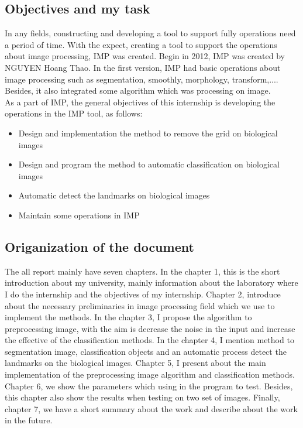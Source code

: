 \subsection{Objectives and my task}
In any fields, constructing and developing a tool to support fully operations need a period of time. With the expect, creating a tool to support the operations about image processing, IMP was created. Begin in 2012, IMP was created by NGUYEN Hoang Thao. In the first version, IMP had basic operations about image processing such as segmentation, smoothly, morphology, transform,.... Besides, it also integrated some algorithm which was processing on image.\\[0.2cm]
As a part of IMP, the general objectives of this internship is developing the operations in the IMP tool, as follows:
\begin{itemize}
\item Design and implementation the method to remove the grid on biological images
\item Design and program the method to automatic classification on biological images
\item Automatic detect the landmarks on biological images
\item Maintain some operations in IMP
\end{itemize}
\subsection{Origanization of the document}
The all report mainly have seven chapters. In the chapter 1, this is the short introduction about my university, mainly information about the laboratory where I do the internship and the objectives of my internship. Chapter 2, introduce about the necessary preliminaries in image processing field which we use to implement the methods. In the chapter 3, I propose the algorithm to preprocessing image, with the aim is decrease the noise in the input and increase the effective of the classification methods. In the chapter 4, I mention method to segmentation image, classification objects and an automatic process detect the landmarks on the biological images. Chapter 5, I present about the main implementation of the preprocessing image algorithm and classification methods. Chapter 6, we show the parameters which using in the program to test. Besides, this chapter also show the results when testing on two set of images. Finally, chapter 7, we have a short summary about the work and describe about the work in the future.






























